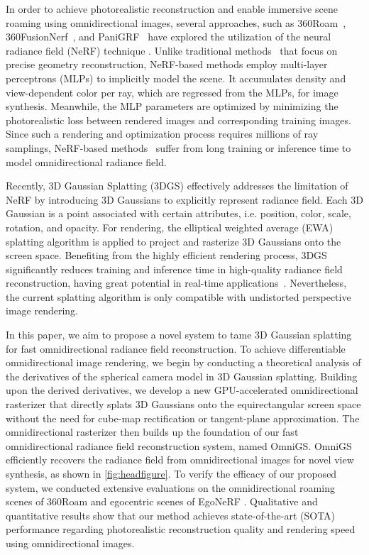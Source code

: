\documentclass[10pt,twocolumn,letterpaper]{article}
\begin{document}
In order to achieve photorealistic reconstruction and enable immersive scene roaming using omnidirectional images, several approaches, such as 360Roam~\cite{nerf:360roam}, 360FusionNerf~\cite{ nerf:360fusionnerf}, and PaniGRF~\cite{nerf:panogrf} have explored the utilization of the neural radiance field (NeRF) technique \cite{nerf}. 
Unlike traditional methods~\cite{sparse:360vo, sparse:360vio, sparse:lfvislam} that focus on precise geometry reconstruction, NeRF-based methods employ multi-layer perceptrons (MLPs) to implicitly model the scene. It accumulates density and view-dependent color per ray, which are regressed from the MLPs, for image synthesis. Meanwhile, the MLP parameters are optimized by minimizing the photorealistic loss between rendered images and corresponding training images. Since such a rendering and optimization process requires millions of ray samplings, NeRF-based methods~\cite{nerf:360roam, nerf:360fusionnerf, nerf:panogrf} suffer from long training or inference time to model omnidirectional radiance field.

Recently, 3D Gaussian Splatting (3DGS) \cite{3dgs} effectively addresses the limitation of NeRF by introducing 3D Gaussians to explicitly represent radiance field.
Each 3D Gaussian is a point associated with certain attributes, i.e. position, color, scale, rotation, and opacity. For rendering, the {elliptical weighted average (EWA)} splatting algorithm \cite{3dgs:ewasplatting} is applied to project and rasterize 3D Gaussians onto the screen space. Benefiting from the highly efficient rendering process, 3DGS significantly reduces training and inference time in high-quality radiance field reconstruction, having great potential in real-time applications~\cite{3dgs:splatam,3dgs:gsslam,3dgs:gaussianslam,3dgs:photoslam}. Nevertheless, the current splatting algorithm is only compatible with undistorted perspective image rendering. 

In this paper, we aim to propose a novel system to tame 3D Gaussian splatting for fast omnidirectional radiance field reconstruction. 
To achieve differentiable omnidirectional image rendering, we begin by conducting a theoretical analysis of the derivatives of the spherical camera model in 3D Gaussian splatting. 
Building upon the derived derivatives, we develop a new GPU-accelerated omnidirectional rasterizer that directly splats 3D Gaussians onto the equirectangular screen space without the need for cube-map rectification or tangent-plane approximation. The omnidirectional rasterizer then builds up the foundation of our fast omnidirectional radiance field reconstruction system, named OmniGS. OmniGS efficiently recovers the radiance field from omnidirectional images for novel view synthesis, as shown in \cref{fig:headfigure}. 
To verify the efficacy of our proposed system, we conducted extensive evaluations on the omnidirectional roaming scenes of 360Roam \cite{nerf:360roam} and egocentric scenes of EgoNeRF \cite{nerf:egonerf}. 
Qualitative and quantitative results show that our method achieves state-of-the-art (SOTA) performance regarding photorealistic reconstruction quality and rendering speed using omnidirectional images. 
\end{document}
